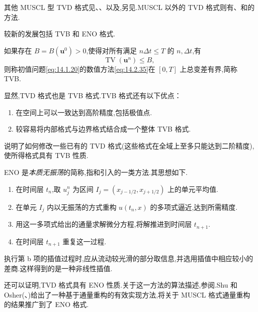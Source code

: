 其他 MUSCL 型 TVD 格式见、、以及,另见.MUSCL 以外的 TVD 格式则有、和的方法.

较新的发展包括 TVB 和 ENO 格式.
\begin{definition*}
如果存在 \(B=B(\boldsymbol{u}^0)>0\),使得对所有满足 \(n\Delta t\le T\) 的 \(n,\Delta t\),有
\begin{equation}\label{eq:14.2.44}
  \operatorname{TV}(\boldsymbol{u}^n)\le B,
\end{equation}
则称初值问题\eqref{eq:14.1.20}的数值方法\eqref{eq:14.2.35}在 \([0,T]\) 上{\heiti 总变差有界},简称 TVB.
\end{definition*}
显然,TVD 格式也是 TVB 格式.TVB 格式还有以下优点：
\begin{enumerate}[label=\alph*.]
  \item 在空间上可以一致达到高阶精度,包括极值点.
  \item 较容易将内部格式与边界格式结合成一个整体 TVB 格式.
\end{enumerate}
说明了如何修改一些已有的 TVD 格式(这些格式在全域上至多只能达到二阶精度),使所得格式具有 TVB 性质.

ENO 是\emph{本质无振荡}的简称,指和引入的一类方法.其思想如下.
\begin{enumerate}[label=\alph*.]
  \item 在时间层 \(t_n\),取 \(u_j^n\) 为区间 \(I_j=(x_{j-1/2},x_{j+1/2})\) 上的单元平均值.
  \item 在单元 \(I_j\) 内以无振荡的方式重构 \(u(t_n,x)\) 的多项式逼近,达到所需精度.
  \item 用这一多项式给出的通量求解微分方程,将解推进到时间层 \(t_{n+1}\).
  \item 在时间层 \(t_{n+1}\) 重复这一过程.
\end{enumerate}
执行第 b 项的插值过程时,应从流动较光滑的部分取信息,并选用插值中相应较小的差商.这样得到的是一种非线性插值.

还可以证明,TVD 格式具有 ENO 性质.关于这一方法的算法描述,参阅.Shu 和 Osher(、)给出了一种基于通量重构的有效实现方法,将关于 MUSCL 格式通量重构的结果推广到了 ENO 格式.

